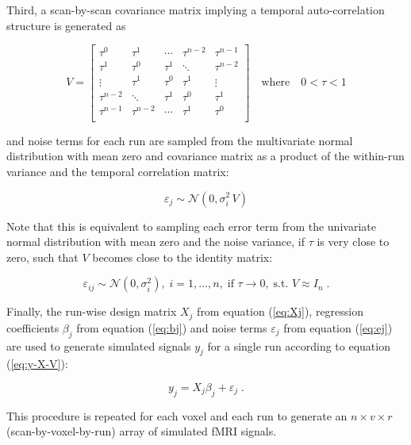 \documentclass[a4paper,12pt]{article}
\begin{document}
\pagebreak
Third, a scan-by-scan covariance matrix implying a temporal auto-correlation structure is generated as

\begin{equation} \label{eq:V}
V = \left[ \begin{matrix}
\tau^0 & \tau^1 & \cdots & \tau^{n-2} & \tau^{n-1} \\
\tau^1 & \tau^0 & \tau^1 & \ddots & \tau^{n-2} \\
\vdots & \tau^1 & \tau^0 & \tau^1 & \vdots \\
\tau^{n-2} & \ddots & \tau^1 & \tau^0 & \tau^1 \\
\tau^{n-1} & \tau^{n-2} & \cdots & \tau^1 & \tau^0 \\
\end{matrix} \right] \quad \text{where} \quad 0 < \tau < 1
\end{equation}

and noise terms for each run are sampled from the multivariate normal distribution with mean zero and covariance matrix as a product of the within-run variance and the temporal correlation matrix:

\begin{equation} \label{eq:ej}
\varepsilon_j \sim \mathcal{N}(0, \sigma_i^2 \, V)
\end{equation}

Note that this is equivalent to sampling each error term from the univariate normal distribution with mean zero and the noise variance, if $\tau$ is very close to zero, such that $V$ becomes close to the identity matrix:

\begin{equation} \label{eq:eij}
\varepsilon_{ij} \sim \mathcal{N}(0, \sigma_i^2), \; i = 1,\ldots,n, \; \text{if } \tau \rightarrow 0, \; \text{s.t. } V \approx I_n \; .
\end{equation}

Finally, the run-wise design matrix $X_j$ from equation (\ref{eq:Xj}), regression coefficients $\beta_j$ from equation (\ref{eq:bj}) and noise terms $\varepsilon_j$ from equation (\ref{eq:ej}) are used to generate simulated signals $y_j$ for a single run according to equation (\ref{eq:y-X-V}):

\begin{equation} \label{eq:yj}
y_j = X_j \beta_j + \varepsilon_j \; .
\end{equation}

This procedure is repeated for each voxel and each run to generate an $n \times v \times r$ (scan-by-voxel-by-run) array of simulated fMRI signals.
\end{document}
